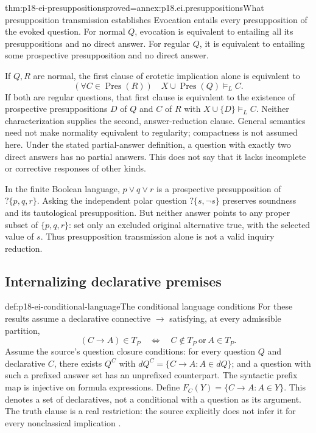 \begin{hbtheorem}{thm:p18-ei-presuppositions}{proved=annex:p18.ei.presuppositions}{What presupposition transmission establishes}
Evocation entails every presupposition of the evoked question. For normal
\(Q\), evocation is equivalent to entailing all its presuppositions and no
direct answer. For regular \(Q\), it is equivalent to entailing some
prospective presupposition and no direct answer.

If \(Q,R\) are normal, the first clause of erotetic implication alone is
equivalent to
\[
 (\forall C\in\operatorname{Pres}(R))\quad
 X\cup\operatorname{Pres}(Q)\models_L C.
\]
If both are regular questions, that first clause is equivalent to the existence
of prospective presuppositions \(D\) of \(Q\) and \(C\) of \(R\) with
\(X\cup\{D\}\models_L C\). Neither characterization supplies the
second, answer-reduction clause. General semantics need not make normality
equivalent to regularity; compactness is not assumed here.
Under the stated partial-answer definition, a question with exactly two
direct answers has no partial answers. This does not say that it lacks
incomplete or corrective responses of other kinds.
\end{hbtheorem}

In the finite Boolean language, \(p\lor q\lor r\) is a prospective
presupposition of \(?\{p,q,r\}\). Asking the independent polar question
\(?\{s,\neg s\}\) preserves soundness and its tautological presupposition.
But neither answer points to any proper subset of \(\{p,q,r\}\): set
only an excluded original alternative true, with the selected value of \(s\).
Thus presupposition transmission alone is not a valid inquiry reduction.

\subsection{Internalizing declarative premises}

\begin{hbdefinition}{def:p18-ei-conditional-language}{The conditional language conditions}
For these results assume a declarative connective \(\to\) satisfying, at
every admissible partition,
\[
 (C\to A)\in T_P\quad\Longleftrightarrow\quad
 C\notin T_P\ \text{or}\ A\in T_P.
\]
Assume the source's question closure conditions: for every question \(Q\)
and declarative \(C\), there exists \(Q^C\) with
\(dQ^C=\{C\to A:A\in dQ\}\); and a question with such a prefixed
answer set has an unprefixed counterpart. The syntactic prefix map is
injective on formula expressions. Define \(F_C(Y)=\{C\to A:A\in Y\}\).
This denotes a set of declaratives, not a conditional with a question as its
argument. The truth clause is a real restriction: the source explicitly does
not infer it for every nonclassical implication
\cite[pp.~301--302]{Wisniewski2018DeductionReduction}.
\end{hbdefinition}

